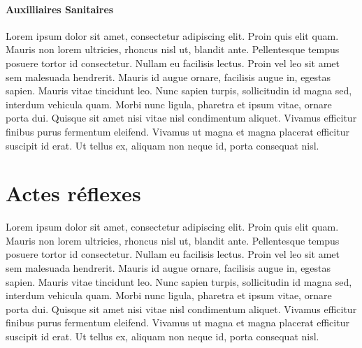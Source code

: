 \documentclass{article}
\begin{document}
			\subsection{Auxilliaires Sanitaires}
				Lorem ipsum dolor sit amet, consectetur adipiscing elit. Proin quis elit quam. Mauris non lorem ultricies, rhoncus nisl ut, blandit ante. Pellentesque tempus posuere tortor id consectetur. Nullam eu facilisis lectus. Proin vel leo sit amet sem malesuada hendrerit. Mauris id augue ornare, facilisis augue in, egestas sapien. Mauris vitae tincidunt leo. Nunc sapien turpis, sollicitudin id magna sed, interdum vehicula quam. Morbi nunc ligula, pharetra et ipsum vitae, ornare porta dui. Quisque sit amet nisi vitae nisl condimentum aliquet. Vivamus efficitur finibus purus fermentum eleifend. Vivamus ut magna et magna placerat efficitur suscipit id erat. Ut tellus ex, aliquam non neque id, porta consequat nisl.
	
	\part{Actes réflexes}
		Lorem ipsum dolor sit amet, consectetur adipiscing elit. Proin quis elit quam. Mauris non lorem ultricies, rhoncus nisl ut, blandit ante. Pellentesque tempus posuere tortor id consectetur. Nullam eu facilisis lectus. Proin vel leo sit amet sem malesuada hendrerit. Mauris id augue ornare, facilisis augue in, egestas sapien. Mauris vitae tincidunt leo. Nunc sapien turpis, sollicitudin id magna sed, interdum vehicula quam. Morbi nunc ligula, pharetra et ipsum vitae, ornare porta dui. Quisque sit amet nisi vitae nisl condimentum aliquet. Vivamus efficitur finibus purus fermentum eleifend. Vivamus ut magna et magna placerat efficitur suscipit id erat. Ut tellus ex, aliquam non neque id, porta consequat nisl.
		
\end{document}
